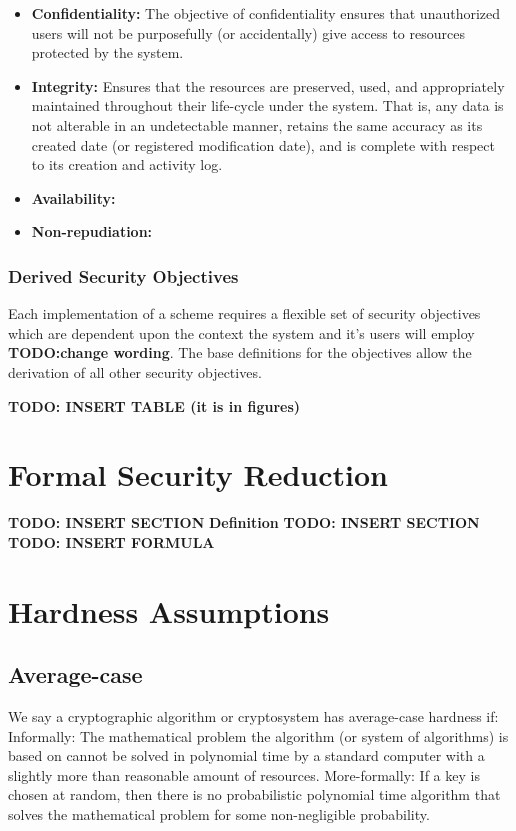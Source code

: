 \begin{itemize}
\item \textbf{Confidentiality:} The objective of confidentiality ensures that unauthorized users will not be purposefully (or accidentally) give access to resources protected by the system. 
\item \textbf{Integrity:} Ensures that the resources are preserved, used, and appropriately maintained throughout their life-cycle under the system. That is, any data is not alterable in an undetectable manner, retains the same
accuracy as its created date (or registered modification date), and is complete with respect to its creation and activity log. 
\item \textbf{Availability:}
\item \textbf{Non-repudiation:} 
\end{itemize}

\subsubsection{Derived Security Objectives}

Each implementation of a scheme requires a flexible set of security objectives which are dependent upon the context the system and it's users will employ \textbf{TODO:change wording}. The base definitions for the objectives allow the derivation of all other security objectives.

\newline
\textbf{TODO: INSERT TABLE (it is in figures)}
\newline
\section{Formal Security Reduction} 
\textbf{TODO: INSERT SECTION}
\textbf{Definition}
\textbf{TODO: INSERT SECTION}
\textbf{TODO: INSERT FORMULA}

\section{Hardness Assumptions} 

\subsection{Average-case}  
We say a cryptographic algorithm or cryptosystem has average-case hardness if: 
Informally: The mathematical problem the algorithm (or system of
algorithms) is based on cannot be solved in polynomial time by a
standard computer with a slightly more than reasonable amount of resources. 
\newline
More-formally: If a key is chosen at random, then there is no probabilistic polynomial time algorithm that solves the mathematical problem for some non-negligible probability. 

